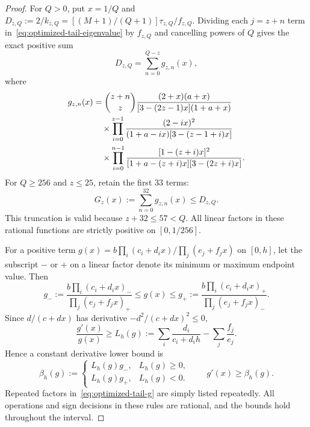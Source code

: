 \documentclass[11pt]{article}
\begin{document}
\begin{proof}
For $Q>0$, put $x=1/Q$ and
$D_{z,Q}:=2/k_{z,Q}=[(M+1)/(Q+1)]\tau_{z,Q}/f_{z,Q}$.
Dividing each $j=z+n$ term in~\eqref{eq:optimized-tail-eigenvalue} by
$f_{z,Q}$ and cancelling powers of $Q$ gives the exact positive sum
\begin{equation}\label{eq:optimized-tail-D}
 D_{z,Q}=\sum_{n=0}^{Q-z}g_{z,n}(x),
\end{equation}
where
\begin{align}
 g_{z,n}(x)&=\binom{z+n}{z}
 \frac{(2+x)(a+x)}{[3-(2z-1)x](1+a+x)}\notag\\
 &\quad\times\prod_{i=0}^{z-1}
 \frac{(2-ix)^2}{(1+a-ix)[3-(z-1+i)x]}\notag\\
 &\quad\times\prod_{i=0}^{n-1}
 \frac{[1-(z+i)x]^2}{[1+a-(z+i)x][3-(2z+i)x]}.
 \label{eq:optimized-tail-g}
\end{align}
For $Q\ge256$ and $z\le25$, retain the first $33$ terms:
\begin{equation}
 G_z(x):=\sum_{n=0}^{32}g_{z,n}(x)\le D_{z,Q}.
\end{equation}
This truncation is valid because $z+32\le57<Q$. All linear factors in
these rational functions are strictly positive on $[0,1/256]$.

For a positive term
$g(x)=b\prod_i(c_i+d_ix)/\prod_j(e_j+f_jx)$ on $[0,h]$, let the subscript
$-$ or $+$ on a linear factor denote its minimum or maximum endpoint value.
Then
\begin{equation}
 g_-:=\frac{b\prod_i(c_i+d_ix)_-}{\prod_j(e_j+f_jx)_+}
 \le g(x)\le
 g_+:=\frac{b\prod_i(c_i+d_ix)_+}{\prod_j(e_j+f_jx)_-}.
\end{equation}
Since $d/(c+dx)$ has derivative $-d^2/(c+dx)^2\le0$,
\begin{equation}
 \frac{g'(x)}{g(x)}\ge
 L_h(g):=\sum_i\frac{d_i}{c_i+d_ih}-\sum_j\frac{f_j}{e_j}.
\end{equation}
Hence a constant derivative lower bound is
\begin{equation}\label{eq:optimized-tail-interval-rule}
 \beta_h(g):=
 \begin{cases}L_h(g)g_-,&L_h(g)\ge0,\\
               L_h(g)g_+,&L_h(g)<0.
 \end{cases}
 \qquad g'(x)\ge\beta_h(g).
\end{equation}
Repeated factors in~\eqref{eq:optimized-tail-g} are simply listed repeatedly.
All operations and sign decisions in these rules are rational, and the
bounds hold throughout the interval.


\end{proof}
\end{document}
